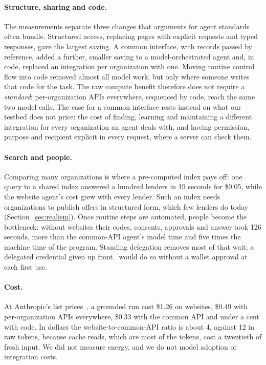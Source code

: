 \documentclass[11pt]{article}
\begin{document}
\paragraph{Structure, sharing and code.} The measurements separate three changes that arguments for agent standards often bundle. Structured access, replacing pages with explicit requests and typed responses, gave the largest saving. A common interface, with records passed by reference, added a further, smaller saving to a model-orchestrated agent and, in code, replaced an integration per organization with one. Moving routine control flow into code removed almost all model work, but only where someone writes that code for the task. The raw compute benefit therefore does not require a \emph{standard}: per-organization APIs everywhere, sequenced by code, reach the same two model calls. The case for a common interface rests instead on what our testbed does not price: the cost of finding, learning and maintaining a different integration for every organization an agent deals with, and having permission, purpose and recipient explicit in every request, where a server can check them.

\paragraph{Search and people.} Comparing many organizations is where a pre-computed index pays off: one query to a shared index answered a hundred lenders in 19 seconds for \$0.05, while the website agent's cost grew with every lender. Such an index needs organizations to publish offers in structured form, which few lenders do today (Section~\ref{sec:realism}). Once routine steps are automated, people become the bottleneck: without websites their codes, consents, approvals and answer took 126 seconds, more than the common-API agent's model time and five times the machine time of the program. Standing delegation removes most of that wait; a delegated credential given up front~\cite{south} would do so without a wallet approval at each first use.

\paragraph{Cost.} At Anthropic's list prices~\cite{anthropicpricing}, a grounded run cost \$1.26 on websites, \$0.49 with per-organization APIs everywhere, \$0.33 with the common API and under a cent with code. In dollars the website-to-common-API ratio is about 4, against 12 in raw tokens, because cache reads, which are most of the tokens, cost a twentieth of fresh input. We did not measure energy, and we do not model adoption or integration costs.
\end{document}
